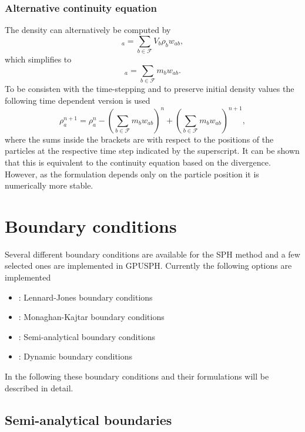 \documentclass[12pt]{memoir}
\newcommand{\sumF}{\underset{b \in \mathcal{F}}{\sum}}
\begin{document}
\subsubsection{Alternative continuity equation}
The density can alternatively be computed by
\begin{equation}
[\rho]_a = \sumF V_b \rho_b w_{ab},
\end{equation}
which simplifies to
\begin{equation}
[\rho]_a = \sumF m_b w_{ab}.
\label{e:sph:sumrho}
\end{equation}
To be consisten with the time-stepping and to preserve initial density
values the following time dependent version is used
\begin{equation}
\rho_a^{n+1} = \rho_a^n - \left(\sumF m_b w_{ab}\right)^n + \left(\sumF
m_b w_{ab}\right)^{n+1},
\label{e:sph:sumrho-time}
\end{equation}
where the sums inside the brackets are with respect to the positions of
the particles at the respective time step indicated by the superscript.
It can be shown  that this is equivalent to the
continuity equation based on the divergence. However, as the formulation
depends only on the particle position it is numerically more stable.

\section{Boundary conditions}\label{sec:boundary_conditions}

Several different boundary conditions are available for the SPH method
and a few selected ones are implemented in GPUSPH. Currently the
following options are implemented
\begin{itemize}
  \item {}: Lennard-Jones boundary conditions
  \item {}: Monaghan-Kajtar boundary conditions
  \item {}: Semi-analytical boundary conditions
  \item {}: Dynamic boundary conditions
\end{itemize}
In the following these boundary conditions and their formulations will
be described in detail.

\subsection{Semi-analytical boundaries}
\end{document}
